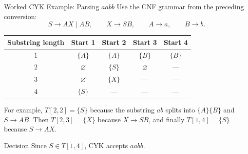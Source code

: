 \documentclass[10pt]{beamer}
\begin{document}
\begin{frame}{Worked CYK Example: Parsing $aabb$}
  \small
  Use the CNF grammar from the preceding conversion:
  \[
    S\to AX\mid AB,\qquad X\to SB,\qquad A\to a,\qquad B\to b.
  \]
  \begin{center}
  \renewcommand{\arraystretch}{1.25}
  \begin{tabular}{c|cccc}
    \toprule
    Substring length & Start 1 & Start 2 & Start 3 & Start 4\\
    \midrule
    $1$ & $\{A\}$ & $\{A\}$ & $\{B\}$ & $\{B\}$\\
    $2$ & $\varnothing$ & $\{S\}$ & $\varnothing$ & ---\\
    $3$ & $\varnothing$ & $\{X\}$ & --- & ---\\
    $4$ & $\{S\}$ & --- & --- & ---\\
    \bottomrule
  \end{tabular}
  \end{center}
  For example, $T[2,2]=\{S\}$ because the substring $ab$ splits into
  $\{A\}\{B\}$ and $S\to AB$. Then $T[2,3]=\{X\}$ because
  $X\to SB$, and finally $T[1,4]=\{S\}$ because $S\to AX$.
  \begin{exampleblock}{Decision}
    Since $S\in T[1,4]$, CYK accepts $aabb$.
  \end{exampleblock}
\end{frame}
\end{document}
